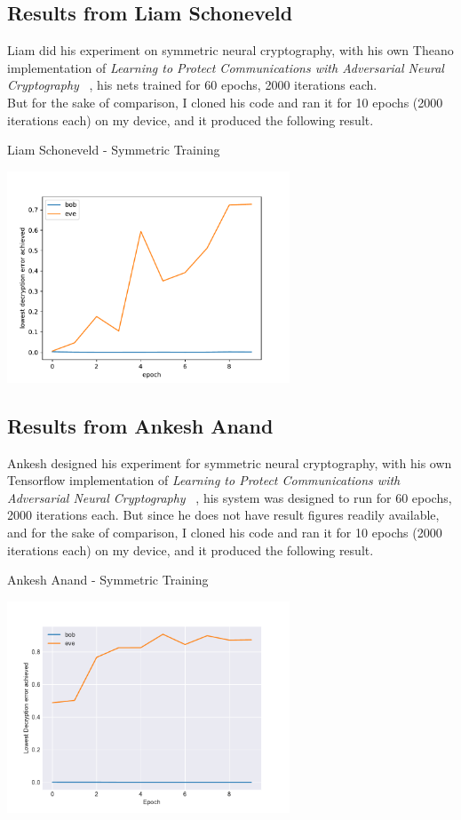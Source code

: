 \documentclass[a4paper, 12pt]{report}
\begin{document}
\subsection{\textbf{Results from Liam Schoneveld}~\citep{nlml/adversarial-neural-cryptography}}
Liam did his experiment on symmetric neural cryptography, with his own Theano implementation of \textit{Learning to Protect Communications with Adversarial Neural Cryptography} ~\citep{DBLP:journals/corr/AbadiA16}, his nets trained for 60 epochs, 2000 iterations each.\\
But for the sake of comparison, I cloned his code and ran it for 10 epochs (2000 iterations each) on my device, and it produced the following result.
\begin{blockfigure}{Liam Schoneveld - Symmetric Training}
	\begin{center}
		\includegraphics[width = 0.63\textwidth]{nlml_results_conv}
	\end{center}
\end{blockfigure}
\subsection{\textbf{Results from Ankesh Anand}~\citep{ankeshanand/neural-cryptography-tensorflow}}
Ankesh designed his experiment for symmetric neural cryptography, with his own Tensorflow implementation of \textit{Learning to Protect Communications with Adversarial Neural Cryptography} ~\citep{DBLP:journals/corr/AbadiA16}, his system was designed to run for 60 epochs, 2000 iterations each.
But since he does not have result figures readily available, and for the sake of comparison, I cloned his code and ran it for 10 epochs (2000 iterations each) on my device, and it produced the following result.
\begin{blockfigure}{Ankesh Anand - Symmetric Training}
	\begin{center}
		\includegraphics[width = 0.63\textwidth]{ankesh_results_conv}
	\end{center}
\end{blockfigure}
\newpage
\end{document}
